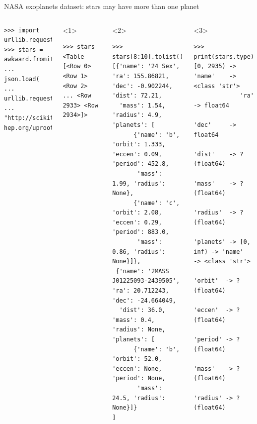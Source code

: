 \documentclass[aspectratio=169]{beamer}
\begin{document}
\begin{frame}[fragile]{NASA exoplanets dataset: stars may have more than one planet}
\begin{columns}
\small
\begin{verbatim}
>>> import urllib.request
>>> stars = awkward.fromiter(
...     json.load(
...         urllib.request.urlopen(
...            "http://scikit-hep.org/uproot/examples/exoplanets.json")))
\end{verbatim}

\begin{onlyenv}<1>
\begin{verbatim}
>>> stars
<Table [<Row 0> <Row 1> <Row 2> ... <Row 2933> <Row 2934>]>
\end{verbatim}

\vspace{10 cm}
\end{onlyenv}
\begin{onlyenv}<2>
\begin{verbatim}
>>> stars[8:10].tolist()
[{'name': '24 Sex', 'ra': 155.86821, 'dec': -0.902244, 'dist': 72.21,
  'mass': 1.54, 'radius': 4.9, 'planets': [
      {'name': 'b', 'orbit': 1.333, 'eccen': 0.09, 'period': 452.8,
       'mass': 1.99, 'radius': None},
      {'name': 'c', 'orbit': 2.08, 'eccen': 0.29, 'period': 883.0,
       'mass': 0.86, 'radius': None}]},
 {'name': '2MASS J01225093-2439505', 'ra': 20.712243, 'dec': -24.664049,
  'dist': 36.0, 'mass': 0.4, 'radius': None, 'planets': [
      {'name': 'b', 'orbit': 52.0, 'eccen': None, 'period': None,
       'mass': 24.5, 'radius': None}]}
]
\end{verbatim}

\vspace{10 cm}
\end{onlyenv}
\begin{onlyenv}<3>
\small
\vspace{-0.6 cm}
\begin{verbatim}
>>> print(stars.type)
[0, 2935) -> 'name'    -> <class 'str'>
             'ra'      -> float64
             'dec'     -> float64
             'dist'    -> ?(float64)
             'mass'    -> ?(float64)
             'radius'  -> ?(float64)
             'planets' -> [0, inf) -> 'name'   -> <class 'str'>
                                      'orbit'  -> ?(float64)
                                      'eccen'  -> ?(float64)
                                      'period' -> ?(float64)
                                      'mass'   -> ?(float64)
                                      'radius' -> ?(float64)
\end{verbatim}


\end{onlyenv}
\end{columns}
\end{frame}
\end{document}
